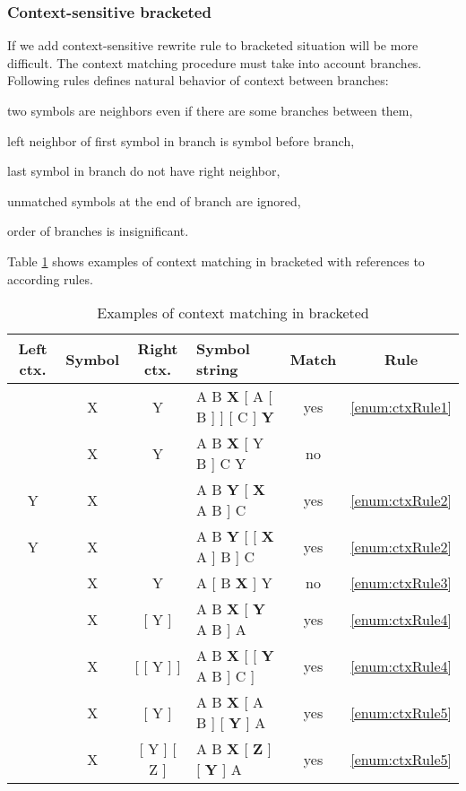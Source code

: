 \subsubsection{Context-sensitive bracketed \lsystems}

If we add context-sensitive rewrite rule to bracketed \lsystems situation will be more difficult.
The context matching procedure must take into account branches.
Following rules defines natural behavior of context between branches:
\begin{enumerate*}
	\item \label{enum:ctxRule1} two symbols are neighbors even if there are some branches between them,
	\item \label{enum:ctxRule2} left neighbor of first symbol in branch is symbol before branch,
	\item \label{enum:ctxRule3} last symbol in branch do not have right neighbor,
	\item \label{enum:ctxRule4} unmatched symbols at the end of branch are ignored,
	\item \label{enum:ctxRule5} order of branches is insignificant.
\end{enumerate*}

Table \ref{tbl:bracketCtxt} shows examples of context matching in bracketed \lsystems with references to according rules.

\begin{table}[ht]
	\centering
	\begin{tabular}{c c c p{128pt} c c}
   		\toprule
   		Left ctx. & Symbol & Right ctx. & Symbol string & Match & Rule\\
   		\midrule
		 & X & Y & A B \textbf{X} [ A [ B ] ] [ C ] \textbf{Y} & yes & \ref{enum:ctxRule1} \\
		 & X & Y & A B \textbf{X} [ Y B ] C Y & no &  \\
		 Y & X & & A B \textbf{Y} [ \textbf{X} A B ] C & yes & \ref{enum:ctxRule2} \\
		 Y & X & & A B \textbf{Y} [ [ \textbf{X} A ] B ] C & yes & \ref{enum:ctxRule2} \\
		 & X & Y & A [ B \textbf{X} ] Y & no & \ref{enum:ctxRule3} \\
		 & X & [ Y ] & A B \textbf{X} [ \textbf{Y} A B ] A  & yes & \ref{enum:ctxRule4} \\
		 & X & [ [ Y ] ] & A B \textbf{X} [ [ \textbf{Y} A B ] C ] & yes & \ref{enum:ctxRule4} \\
		 & X & [ Y ] & A B \textbf{X} [ A B ] [ \textbf{Y} ] A  & yes & \ref{enum:ctxRule5} \\
		 & X & [ Y ] [ Z ] & A B \textbf{X} [ \textbf{Z} ] [ \textbf{Y} ] A  & yes & \ref{enum:ctxRule5} \\
		\bottomrule
	\end{tabular}
	\caption{Examples of context matching in bracketed \lsystems}
	\label{tbl:bracketCtxt}
\end{table}

